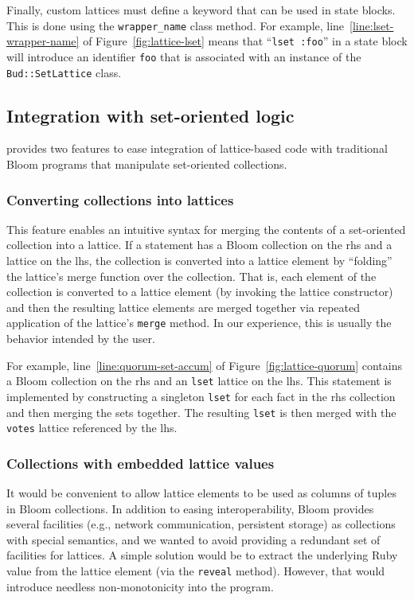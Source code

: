Finally, custom lattices must define a keyword that can be used in \lang state
blocks. This is done using the \texttt{wrapper\_name} class method. For example,
line~\ref{line:lset-wrapper-name} of Figure~\ref{fig:lattice-lset} means that
``\texttt{lset :foo}'' in a \lang state block will introduce an identifier
\texttt{foo} that is associated with an instance of the \texttt{Bud::SetLattice}
class.

\subsection{Integration with set-oriented logic}
\label{sec:bloom-interop}
\lang provides two features to ease integration of lattice-based code with
traditional Bloom programs that manipulate set-oriented collections.

\subsubsection{Converting collections into lattices}
This feature enables an intuitive syntax for merging the contents of a
set-oriented collection into a lattice. If a statement has a Bloom collection on
the rhs and a lattice on the lhs, the collection is converted into a lattice
element by ``folding'' the lattice's merge function over the collection. That
is, each element of the collection is converted to a lattice element (by
invoking the lattice constructor) and then the resulting lattice elements are
merged together via repeated application of the lattice's \texttt{merge}
method. In our experience, this is usually the behavior intended by the user.

For example, line~\ref{line:quorum-set-accum} of Figure~\ref{fig:lattice-quorum}
contains a Bloom collection on the rhs and an \texttt{lset} lattice on the
lhs. This statement is implemented by constructing a singleton \texttt{lset} for
each fact in the rhs collection and then merging the sets together. The
resulting \texttt{lset} is then merged with the \texttt{votes} lattice
referenced by the lhs.

\subsubsection{Collections with embedded lattice values}
\label{sec:lattice-embedding}
It would be convenient to allow lattice elements to be used as columns of
tuples in Bloom collections. In addition to easing interoperability, Bloom
provides several facilities (e.g., network communication, persistent storage) as
collections with special semantics, and we wanted to avoid providing a redundant
set of facilities for lattices. A simple solution would be to extract the
underlying Ruby value from the lattice element (via the \texttt{reveal} method).
However, that would introduce needless non-monotonicity into the program.

